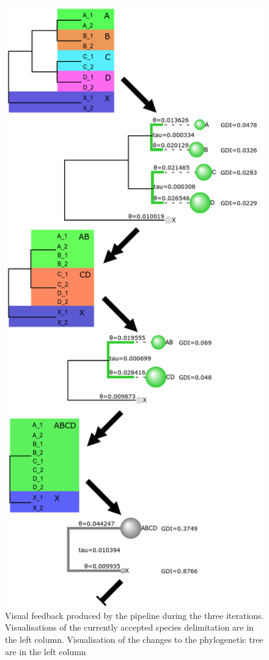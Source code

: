 \documentclass[A4]{article1}
\begin{document}
\begin{figure}[h]
	\begin{center}
		\includegraphics[scale=0.35]{figs/Pipedemo/sim_fig_v1}
	\end{center}
	\caption{Visual feedback produced by the pipeline during the three iterations. Visualisations of the currently accepted species delimitation are in the left column. Visualisation of the changes to the phylogenetic tree are in the left column}
	\label{fig:ABCDX_out}
\end{figure}
\end{document}

